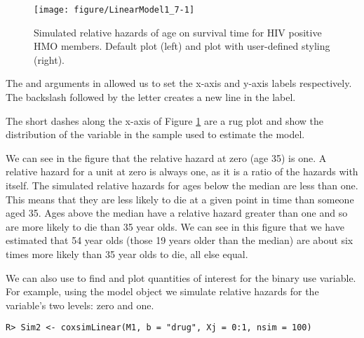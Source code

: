 \documentclass[nojss]{jss}\usepackage[]{graphicx}\usepackage[]{color}
\makeatletter
\newenvironment{kframe}{%
 \def\at@end@of@kframe{}%
 \ifinner\ifhmode%
  \def\at@end@of@kframe{\end{minipage}}%
  \begin{minipage}{\columnwidth}%
 \fi\fi%
 \def\FrameCommand##1{\hskip\@totalleftmargin \hskip-\fboxsep
 \colorbox{shadecolor}{##1}\hskip-\fboxsep
     \hskip-\linewidth \hskip-\@totalleftmargin \hskip\columnwidth}%
 \MakeFramed {\advance\hsize-\width
   \@totalleftmargin\z@ \linewidth\hsize
   \@setminipage}}%
 {\par\unskip\endMakeFramed%
 \at@end@of@kframe}
\newenvironment{knitrout}{}{} %
\makeatother
\begin{document}
\begin{figure}

\begin{knitrout}
\color{fgcolor}

{\centering \texttt{[image: figure/LinearModel1\_7-1]} 

}



\end{knitrout}

    \caption{Simulated relative hazards of age on survival time for HIV positive HMO members. Default  plot (left) and plot with user-defined styling (right).}
    \label{LinearPlot}
\end{figure}

The  and  arguments in  allowed us to set the x-axis and y-axis labels respectively. The backslash followed by the letter  creates a new line in the label.

The short dashes along the x-axis of Figure \ref{LinearPlot} are a rug plot and show the distribution of the variable in the sample used to estimate the model.

We can see in the figure that the relative hazard at  zero (age 35) is one. A relative hazard for a unit at zero is always one, as it is a ratio of the hazards with itself. The simulated relative hazards for ages below the median are less than one. This means that they are less likely to die at a given point in time than someone aged 35. Ages above the median have a relative hazard greater than one and so are more likely to die than 35 year olds. We can see in this figure that we have estimated that 54 year olds (those 19 years older than the median) are about six times more likely than 35 year olds to die, all else equal.

We can also use  to find and plot quantities of interest for the binary  use variable. For example, using the model object  we simulate relative hazards for the variable's two levels: zero and one.

\begin{knitrout}
\color{fgcolor}\begin{kframe}
\begin{verbatim}
R> Sim2 <- coxsimLinear(M1, b = "drug", Xj = 0:1, nsim = 100)
\end{verbatim}
\end{kframe}
\end{knitrout}
\end{document}
